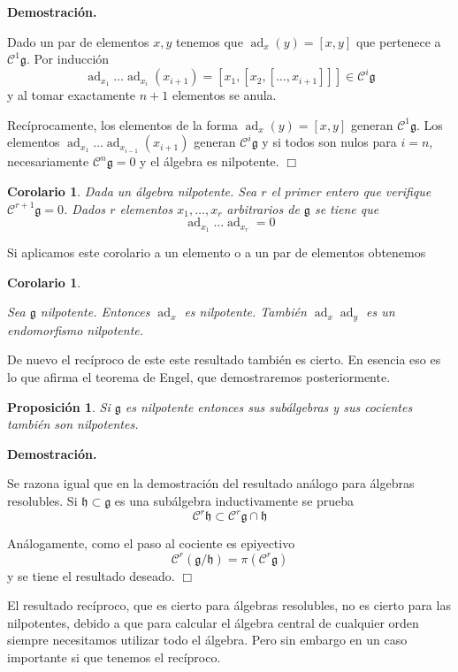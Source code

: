 \documentclass[a4paper,draft,12pt]{scrartcl}
\newtheorem{propo}[teo]{Proposición}%
\newtheorem{cor}[teo]{Corolario}%
\newcommand{\dem}{\noindent \textbf{Demostración. }\vspace{0.3 cm}}%
\newcommand{\g}{\mathfrak{g}}%
\newcommand{\fin}{ $\Box $ \vspace{0.4 cm}}
\newcommand{\central}{\mathcal{C}}%
\DeclareMathOperator{\ad}{ad}  %
\begin{document}
\dem

Dado un par de elementos $x,y$ tenemos que $\ad_x(y)=[x,y]$ que pertenece a $\central^1\g$.  Por inducción 
$$
\ad_{x_1}\dots\ad_{x_{i}}(x_{i+1})= [x_1,[x_2,[\dots,x_{i+1}]]] \in \central^i\g
$$
y al tomar exactamente $n+1$ elementos se anula.

\bigskip

Recíprocamente, los elementos de la forma $\ad_x(y)=[x,y]$ generan $\central^1\g$. Los  elementos $\ad_{x_1}\dots\ad_{x_{i-1}}(x_{i+1})$ generan $\central^i\g$ y si todos son nulos para $i=n$, necesariamente $\central^n\g=0$ y el álgebra es nilpotente. \fin


\begin{cor}

Dada un álgebra nilpotente. Sea $r$ el primer entero que verifique $\central^{r+1}\g=0$.  Dados $r$ elementos $x_1,\dots,x_r$ arbitrarios de $\g$ se tiene que
$$
\ad_{x_1}\dots\ad_{x_r}=0
$$

\end{cor}

Si aplicamos este corolario a un elemento o a un par de elementos obtenemos

\begin{cor}\label{cor:adnilpotente}

Sea $\g$ nilpotente.  Entonces $\ad_x$ es nilpotente.  También $\ad_x\ad_y$ es un endomorfismo nilpotente.

\end{cor}

De nuevo el recíproco de este este resultado también es cierto.  En esencia eso es lo que afirma el teorema de Engel, que demostraremos posteriormente.


\begin{propo}

Si $\g$ es nilpotente entonces sus subálgebras y sus cocientes también son nilpotentes.

\end{propo}

\dem


Se razona igual que en la demostración del resultado análogo para álgebras resolubles.
Si $\mathfrak{h}\subset \g$ es una subálgebra inductivamente se prueba
$$
\central^r\mathfrak{h}\subset \central^r \g \cap \mathfrak{h}
$$

Análogamente, como el paso al cociente es epiyectivo
$$
\central^r(\g/\mathfrak{h})= \pi (\central^r \g)
$$
y se tiene el resultado deseado. \fin


El resultado recíproco, que es cierto para álgebras resolubles, no es cierto para las nilpotentes, debido a que para calcular el álgebra central de cualquier orden siempre necesitamos utilizar todo el álgebra.  Pero sin embargo en un caso  importante si que tenemos el recíproco.
\end{document}
